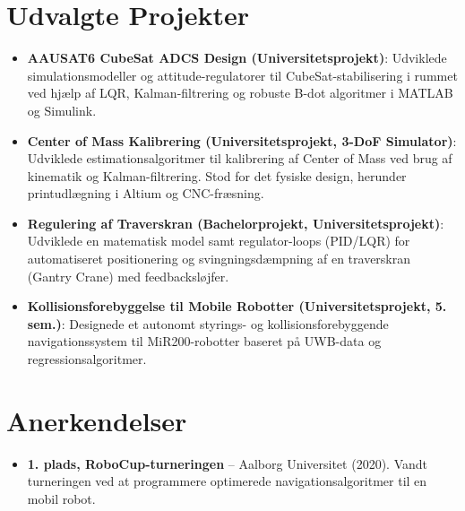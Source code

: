 \documentclass[11pt,a4paper,sans]{moderncv}
\begin{document}
\section{Udvalgte Projekter}
\vspace{1pt}
\begin{itemize}

\item{\textbf{AAUSAT6 CubeSat ADCS Design (Universitetsprojekt)}: Udviklede simulationsmodeller og attitude-regulatorer til CubeSat-stabilisering i rummet ved hjælp af LQR, Kalman-filtrering og robuste B-dot algoritmer i MATLAB og Simulink.}

\item{\textbf{Center of Mass Kalibrering (Universitetsprojekt, 3-DoF Simulator)}: Udviklede estimationsalgoritmer til kalibrering af Center of Mass ved brug af kinematik og Kalman-filtrering. Stod for det fysiske design, herunder printudlægning i Altium og CNC-fræsning.}

\item{\textbf{Regulering af Traverskran (Bachelorprojekt, Universitetsprojekt)}: Udviklede en matematisk model samt regulator-loops (PID/LQR) for automatiseret positionering og svingningsdæmpning af en traverskran (Gantry Crane) med feedbacksløjfer.}

\item{\textbf{Kollisionsforebyggelse til Mobile Robotter (Universitetsprojekt, 5. sem.)}: Designede et autonomt styrings- og kollisionsforebyggende navigationssystem til MiR200-robotter baseret på UWB-data og regressionsalgoritmer.}

\end{itemize}


\section{Anerkendelser}
\vspace{1pt}
\begin{itemize}
\item{\textbf{1. plads, RoboCup-turneringen} -- Aalborg Universitet (2020). Vandt turneringen ved at programmere optimerede navigationsalgoritmer til en mobil robot.}
\end{itemize}

\end{document}

